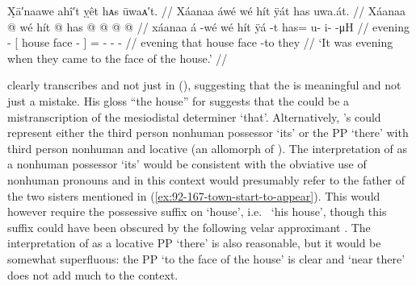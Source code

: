 
\ex\label{ex:92-169-evening-came-to-house}%
%
\begingl
	\glpreamble	X̣ā′naawe ahî′t ỵêt hᴀs ūwaᴀ′t. //
	\glpreamble	Xáanaa áwé wé hít ÿát has uwa.át. //
	\gla	Xáanaa  @ {}
		{} wé hít  @ {} {}
		has @  @ {} @ {} @ {} //
	\glb	xáanaa á -wé
		{} wé hít ÿá -t {}
		has= u- i-  -μH //
	\glc	evening  -
		{}[  house face - {}]
		= - -  - //
	\gld	evening  {}
		{} that house face -to {}
		they  {} {} {} //
	\glft	‘It was evening when they came to the face of the house.’
		//
\endgl
\xe

\citeauthor{swanton:1909} clearly transcribes  and not just  in (\lastx), suggesting that the  is meaningful and not just a mistake.
His gloss “the house” for  suggests that the  could be a mistranscription of the mesiodistal determiner  ‘that’.
Alternatively, \citeauthor{swanton:1909}’s  could represent either the third person nonhuman possessor  ‘its’ or the PP  ‘there’ with third person nonhuman  and locative  (an allomorph of ).
The interpretation of  as a nonhuman possessor  ‘its’ would be consistent with the obviative use of nonhuman pronouns and in this context would presumably refer to the father of the two sisters mentioned in (\ref{ex:92-167-town-start-to-appear}).
This would however require the possessive suffix  on  ‘house’, i.e.\  ‘his house’, though this suffix could have been obscured by the following velar approximant .
The interpretation of  as a locative PP  ‘there’ is also reasonable, but it would be somewhat superfluous: the PP  ‘to the face of the house’ is clear and  ‘near there’ does not add much to the context.


